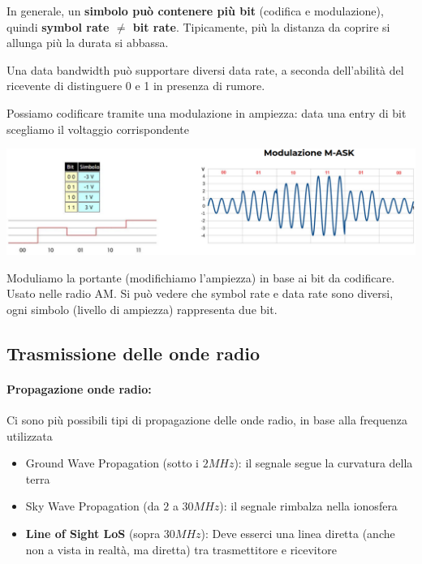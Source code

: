 In generale, un \textbf{simbolo può contenere più bit} (codifica e modulazione), quindi \textbf{symbol rate $\neq$ bit rate}. Tipicamente, più la distanza da coprire si allunga più la durata si abbassa.

Una data bandwidth può supportare diversi data rate, a seconda dell'abilità del ricevente di distinguere 0 e 1 in presenza di rumore.

Possiamo codificare tramite una modulazione in ampiezza: data una entry di bit scegliamo il voltaggio corrispondente
\begin{center}
	\includegraphics[width=\linewidth]{img/wireless/modam1}
\end{center}

Moduliamo la portante (modifichiamo l'ampiezza) in base ai bit da codificare. Usato nelle radio AM. Si può vedere che symbol rate e data rate sono diversi, ogni simbolo (livello di ampiezza) rappresenta due bit.

\subsection{Trasmissione delle onde radio}

\paragraph{Propagazione onde radio:} Ci sono più possibili tipi di propagazione delle onde radio, in base alla frequenza utilizzata
\begin{itemize}
	\item Ground Wave Propagation (sotto i $2MHz$): il segnale segue la curvatura della terra

	\item Sky Wave Propagation (da $2$ a $30MHz$): il segnale rimbalza nella ionosfera

	\item \textbf{Line of Sight LoS} (sopra $30MHz$): Deve esserci una linea diretta (anche non a vista in realtà, ma diretta) tra trasmettitore e ricevitore
\end{itemize}

